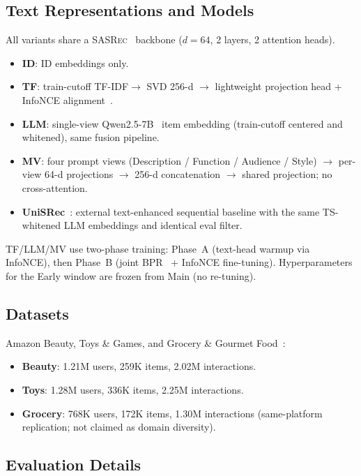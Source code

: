 \documentclass[sigconf,natbib=true,anonymous]{acmart}
\newcommand{\tfidf}{\textsc{TF-IDF}\xspace}
\newcommand{\base}{\textsc{SASRec}\xspace}
\begin{document}
\subsection{Text Representations and Models}
\label{sec:models}

All variants share a \base~\cite{kang2018sasrec} backbone ($d{=}64$, 2 layers, 2 attention heads).

\begin{itemize}[leftmargin=*,itemsep=1pt]
\item \textbf{ID}: ID embeddings only.
\item \textbf{TF}: train-cutoff \tfidf $\to$ SVD 256-d $\to$ lightweight projection head + InfoNCE alignment~\cite{oord2018cpc}.
\item \textbf{LLM}: single-view Qwen2.5-7B~\cite{qwen2024qwen25} item embedding (train-cutoff centered and whitened), same fusion pipeline.
\item \textbf{MV}: four prompt views (Description / Function / Audience / Style) $\to$ per-view 64-d projections $\to$ 256-d concatenation $\to$ shared projection; no cross-attention.
\item \textbf{UniSRec}~\cite{hou2022unisrec}: external text-enhanced sequential baseline with the same TS-whitened LLM embeddings and identical eval filter.
\end{itemize}

TF/LLM/MV use two-phase training: Phase~A (text-head warmup via InfoNCE), then Phase~B (joint BPR~\cite{rendle2009bpr} + InfoNCE fine-tuning).
Hyperparameters for the Early window are frozen from Main (no re-tuning).

\subsection{Datasets}

Amazon Beauty, Toys \& Games, and Grocery \& Gourmet Food~\cite{mcauley2015amazon,ni2019amazon}:
\begin{itemize}[leftmargin=*,itemsep=1pt]
\item \textbf{Beauty}: 1.21M users, 259K items, 2.02M interactions.
\item \textbf{Toys}: 1.28M users, 336K items, 2.25M interactions.
\item \textbf{Grocery}: 768K users, 172K items, 1.30M interactions (same-platform replication; not claimed as domain diversity).
\end{itemize}

\subsection{Evaluation Details}
\end{document}
